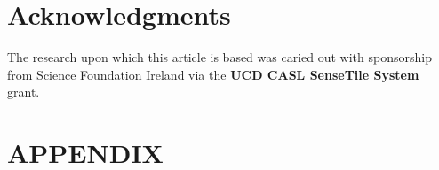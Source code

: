 \documentclass{article}
\begin{document}
\section {Acknowledgments}
The research upon which this article is based was caried out with
sponsorship from Science Foundation Ireland via the
\textbf{UCD CASL SenseTile System} grant.






\appendix
\newpage
\section {APPENDIX}

























\end{document}
